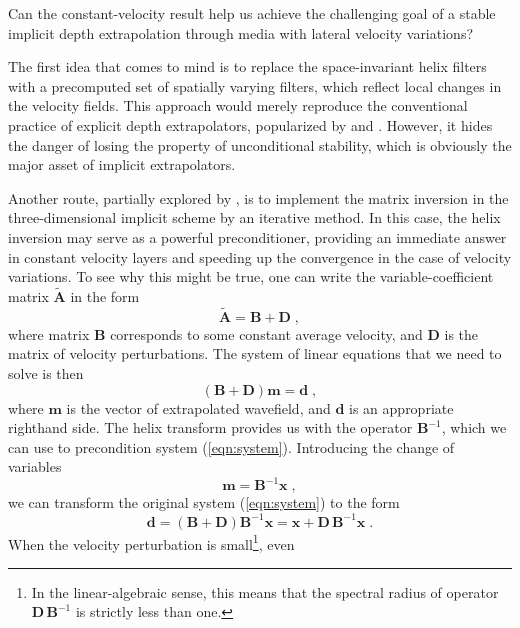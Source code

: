 Can the constant-velocity result help us achieve the challenging goal
of a stable implicit depth extrapolation through media with lateral
velocity variations?
\par
The first idea that comes to mind is to replace the space-invariant
helix filters with a precomputed set of spatially varying filters,
which reflect local changes in the velocity fields. This approach
would merely reproduce the conventional practice of explicit depth
extrapolators, popularized by \cite{GPR36-02-00990114} and
\cite{GEO56-11-17701777}. However, it hides the danger of losing
the property of unconditional stability, which is obviously the major
asset of implicit extrapolators.
\par
Another route, partially explored by \cite{Nichols.sep.70.31}, is
to implement the matrix inversion in the three-dimensional implicit
scheme by an iterative method. In this case, the helix inversion may
serve as a powerful preconditioner, providing an immediate answer in
constant velocity layers and speeding up the convergence in the case
of velocity variations. To see why this might be true, one can write
the variable-coefficient matrix $\tilde{\mathbf{A}}$ in the form
\begin{equation}
  \label{eqn:golub}
  \tilde{\mathbf{A}} = \mathbf{B} + \mathbf{D}\;,
\end{equation}
where matrix $\mathbf{B}$ corresponds to some constant average velocity,
and $\mathbf{D}$ is the matrix of velocity perturbations. The system of
linear equations that we need to solve is then
\begin{equation}
  \label{eqn:system}
  \left(\mathbf{B} + \mathbf{D}\right) \mathbf{m} = \mathbf{d}\;,
\end{equation}
where $\mathbf{m}$ is the vector of extrapolated wavefield, and
$\mathbf{d}$ is an appropriate righthand side. The helix transform
provides us with the operator $\mathbf{B}^{-1}$, which we can use to
precondition system (\ref{eqn:system}). Introducing the change of
variables
\begin{equation}
  \label{eqn:prec}
  \mathbf{m} = \mathbf{B}^{-1} \mathbf{x}\;,
\end{equation}
we can transform the original system (\ref{eqn:system}) to the form
\begin{equation}
  \label{eqn:system2}
  \mathbf{d} = \left(\mathbf{B} + \mathbf{D}\right) \mathbf{B}^{-1} \mathbf{x} = 
  \mathbf{x} + \mathbf{D}\,\mathbf{B}^{-1} \mathbf{x}\;.
\end{equation}
When the velocity perturbation is small\footnote{In the
  linear-algebraic sense, this means that the spectral radius of
  operator $\mathbf{D}\,\mathbf{B}^{-1}$ is strictly less than one.}, even
